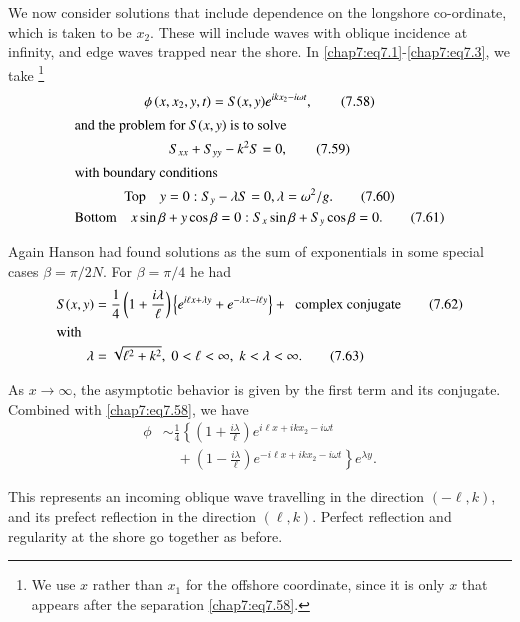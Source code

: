 {{We now consider solutions that include dependence on the longshore co-ordinate, which is taken to be $x_2$. These will include waves with oblique incidence at infinity, and edge waves trapped near the shore. In \eqref{chap7:eq7.1}-\eqref{chap7:eq7.3}, we take \footnote{We use $x$ rather than $x_1$ for the offshore coordinate, since it is only $x$ that appears after the separation \eqref{chap7:eq7.58}.}
\begin{gather}
\phi\left(x,x_2,y,t\right)=S(x,y)e^{ikx_2-i\omega t}, \tag{7.58}\label{chap7:eq7.58}\\
\intertext{and the problem for $S(x,y)$ is to solve}
S_{xx}+S_{yy}-k^2S=0,\tag{7.59}\label{chap7:eq7.59}\\
\intertext{with boundary conditions}
\text{Top}\quad y=0:S_y-\lambda S=0,\lambda =\omega^2/g. \tag{7.60}\label{chap7:eq7.60}\\
\text{Bottom}\quad x\sin\beta +y\cos\beta =0:S_x\sin\beta +S_y\cos\beta=0. \tag{7.61}\label{chap7:eq7.61}
\end{gather}

Again Hanson \cite{key11} had found solutions as the sum of exponentials in some special cases $\beta=\pi/2N$. For $\beta =\pi/4$ he had 
\begin{align}
S(x,y) &= \frac{1}{4}\left(1+\frac{i\lambda}{\ell}\right)\left\{e^{i\ell x+\lambda y}+e^{-\lambda x-i\ell y}\right\}+\text{\; complex conjugate} \tag{7.62}\label{chap7:eq7.62}\\
\intertext{with}
\lambda &= \sqrt{\ell^2+k^2},\; 0<\ell <\infty,\; k<\lambda <\infty. \tag{7.63}\label{chap7:eq7.63}
\end{align}

As $x\to\infty$, the asymptotic behavior is given by the first term and its conjugate. Combined with \eqref{chap7:eq7.58}, we have 
\begin{equation}
\begin{aligned}
\phi &\sim\frac{1}{4}\left\{\left(1+\frac{i\lambda}{\ell}\right)e^{i\ell x+ikx_2-i\omega t}\right.\\
&\quad +\left.\left(1-\frac{i\lambda}{\ell}\right)e^{-i\ell x+ikx_2-i\omega t}\right\}e^{\lambda y}.
\end{aligned}\tag{7.64}\label{chap7:eq7.64}
\end{equation}\pageoriginale

This represents an incoming oblique wave travelling in the direction $(-\ell,k)$, and its prefect reflection in the direction $(\ell,k)$. Perfect reflection and regularity at the shore go together as before.

}}

